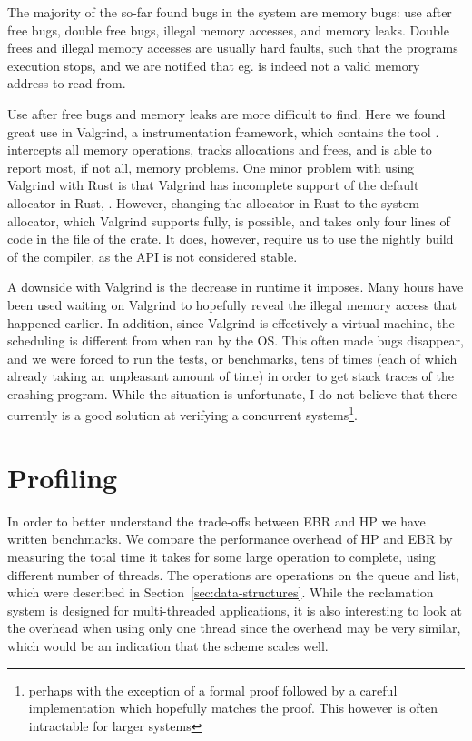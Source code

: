 \documentclass[b5paper]{report}
\begin{document}
The majority of the so-far found bugs in the system are memory bugs: use after
free bugs, double free bugs, illegal memory accesses, and memory leaks. Double
frees and illegal memory accesses are usually hard faults, such that the
programs execution stops, and we are notified that eg.  is indeed not
a valid memory address to read from.

Use after free bugs and memory leaks are more difficult to find. Here we found
great use in Valgrind\cite{valgrind}, a instrumentation framework, which
contains the tool .  intercepts all memory
operations, tracks allocations and frees, and is able to report most, if not
all, memory problems. One minor problem with using Valgrind with Rust is that
Valgrind has incomplete support of the default allocator in Rust,
\cite{jemalloc}. However, changing the allocator in Rust to the system
allocator, which Valgrind supports fully, is possible, and takes only four lines
of code in the  file of the crate. It does, however, require us to
use the nightly build of the compiler, as the API is not considered stable.

A downside with Valgrind is the decrease in runtime it imposes. Many hours have
been used waiting on Valgrind to hopefully reveal the illegal memory access that
happened earlier. In addition, since Valgrind is effectively a virtual machine,
the scheduling is different from when ran by the OS\@. This often made bugs
disappear, and we were forced to run the tests, or benchmarks, tens of times
(each of which already taking an unpleasant amount of time) in order to get
stack traces of the crashing program. While the situation is unfortunate, I do
not believe that there currently is a good solution at verifying a concurrent
systems\footnote{perhaps with the exception of a formal proof followed by a
careful implementation which hopefully matches the proof. This however is often
intractable for larger systems}.


\section{Profiling\label{sec:profiling}}

In order to better understand the trade-offs between EBR and HP we have written
benchmarks. We compare the performance overhead of HP and EBR by measuring the
total time it takes for some large operation to complete, using different number
of threads. The operations are  operations on the queue and list, which
were described in Section~\ref{sec:data-structures}. While the reclamation
system is designed for multi-threaded applications, it is also interesting to
look at the overhead when using only one thread since the overhead may be very
similar, which would be an indication that the scheme scales well.
\end{document}
